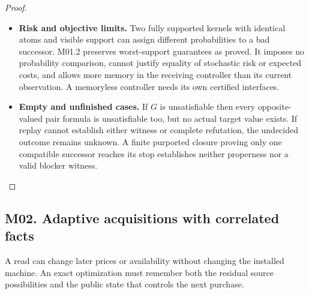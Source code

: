 \begin{proof}
\begin{itemize}
\item
  \textbf{Risk and objective limits.} Two fully supported kernels with identical atoms and visible support can assign different probabilities to a bad successor. M01.2 preserves worst-support guarantees as proved. It imposes no probability comparison, cannot justify equality of stochastic risk or expected costs, and allows more memory in the receiving controller than its current observation. A memoryless controller needs its own certified interfaces.
\item
  \textbf{Empty and unfinished cases.} If \(G\) is unsatisfiable then every opposite-valued pair formula is unsatisfiable too, but no actual target value exists. If replay cannot establish either witness or complete refutation, the undecided outcome remains unknown. A finite purported closure proving only one compatible successor reaches its stop establishes neither properness nor a valid blocker witness.
\end{itemize}

\end{proof}

\subsection{M02. Adaptive acquisitions with correlated facts}

\label{ext:m02}

A read can change later prices or availability without changing the installed machine. An exact optimization must remember both the residual source possibilities and the public state that controls the next purchase.

